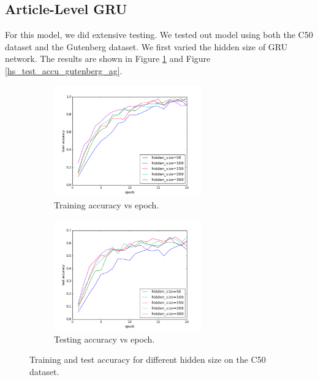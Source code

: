 \documentclass{article} %
\begin{document}
\subsection{Article-Level GRU}
For this model, we did extensive testing. We tested out model using both the C50 dataset and the Gutenberg dataset. We first varied the hidden size of GRU network. The results are shown in Figure \ref{hs_test_accu_c50_ag} and Figure \ref{hs_test_accu_gutenberg_ag}.
%
\begin{figure}[H]
\begin{subfigure}{0.5\linewidth}
\centering
\includegraphics[width=0.7\textwidth]{figures/epoch_train_accu_hs_c.png} 
\caption{Training accuracy vs epoch.}
\end{subfigure}
\begin{subfigure}{0.5\linewidth}
\centering
\includegraphics[width=0.7\textwidth]{figures/epoch_test_accu_hs_c.png} 
\caption{Testing accuracy vs epoch.}
\end{subfigure}
\caption{Training and test accuracy for different hidden size on the C50 dataset.}
\label{hs_test_accu_c50_ag}
\end{figure}
%
\end{document}
